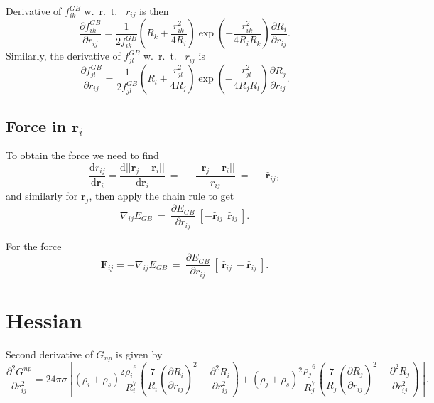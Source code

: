 \documentclass[12pt]{article}
\begin{document}
Derivative of $f_{ik}^{GB}$  w.~r.~t.~ $r_{ij}$ is then
\begin{equation}
\label{eq:fklGBderv2}
\frac{\partial f_{ik}^{GB}}{\partial r_{ij}} = \frac{1}{2f_{ik}^{GB}} \left( R_{k} + \frac{r_{ik}^{2}}{4R_{i}} \right) \exp\left(-\frac{r_{ik}^{2}}{4R_{i}R_{k}}\right)\frac{\partial R_{i}}{\partial r_{ij}}.
\end{equation}
Similarly, the derivative of $f_{jl}^{GB}$  w.~r.~t.~ $r_{ij}$ is
\begin{equation}
\label{eq:fklGBderv3}
\frac{\partial f_{jl}^{GB}}{\partial r_{ij}} = \frac{1}{2f_{jl}^{GB}} \left( R_{l} + \frac{r_{jl}^{2}}{4R_{j}} \right) \exp\left(-\frac{r_{jl}^{2}}{4R_{j}R_{l}}\right)\frac{\partial R_{j}}{\partial r_{ij}}.
\end{equation}

\subsection{Force in $\mathbf{r}_i$}

To obtain the force we need to find
\begin{equation}
\frac{\mathrm{d}r_{ij}}{\mathrm{d}\mathbf{r}_i} =
\frac{\mathrm{d}||\mathbf{r}_j-\mathbf{r}_i||}{\mathrm{d}\mathbf{r}_i}~=~-\frac{||\mathbf{r}_j-\mathbf{r}_i||}{r_{ij}}~=~-\hat{\mathbf{r}}_{ij},
\end{equation}
and similarly for $\mathbf{r}_j$, then apply the chain rule to get
\begin{equation}
\label{nablaes}\nabla_{ij}E_{GB} ~=~ \frac{\partial E_{GB}}{\partial r_{ij}} ~[-\hat{\mathbf{r}}_{ij} ~~ \hat{\mathbf{r}}_{ij}~].
\end{equation}

For the force
\begin{equation}
\mathbf{F}_{ij} = -\nabla_{ij}E_{GB} ~=~ \frac{\partial E_{GB}}{\partial r_{ij}} ~[~\hat{\mathbf{r}}_{ij} ~ -\hat{\mathbf{r}}_{ij}~].
\end{equation}

\section{Hessian}
Second derivative of $G_{np}$ is given by
\begin{equation}
\label{eq:GnpHess1}
\frac{\partial^{2} G^{np}}{\partial r_{ij}^{2}} = 24{\pi}{\sigma}\left[ ({\rho}_{i} + {\rho}_{s})^{2}\frac{{\rho_{i}}^{6}}{R_{i}^{7}}
\left(\frac{7}{R_{i}}\left(\frac{\partial R_{i}}{\partial r_{ij}}\right)^{2} - \frac{\partial^{2}R_{i}}{\partial r_{ij}^{2}}\right)+ ({\rho}_{j} + {\rho}_{s})^{2}
\frac{{\rho_{j}}^{6}}{R_{j}^{7}} \left(\frac{7}{R_{j}}\left(\frac{\partial R_{j}}{\partial r_{ij}}\right)^{2} -  \frac{\partial^{2}R_{j}}{\partial r_{ij}^{2}}\right) \right]. 
\end{equation}
\end{document}
